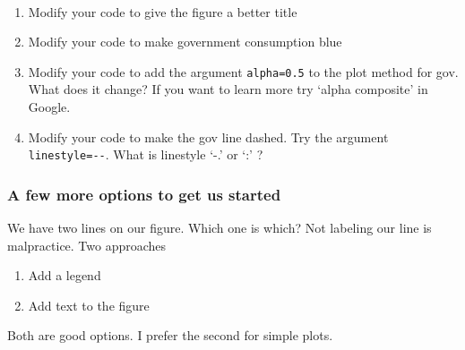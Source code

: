 \documentclass[11pt]{article}
\providecommand{\tightlist}{%
      \setlength{\itemsep}{0pt}\setlength{\parskip}{0pt}}
\begin{document}
    \begin{center}
    \end{center}
    { \hspace*{\fill} \\}
    
    \begin{enumerate}
\def\labelenumi{\arabic{enumi}.}
\setcounter{enumi}{1}
\tightlist
\item
  Modify your code to give the figure a better title
\item
  Modify your code to make government consumption blue
\item
  Modify your code to add the argument \texttt{alpha=0.5} to the plot
  method for gov. What does it change? If you want to learn more try
  `alpha composite' in Google.
\item
  Modify your code to make the gov line dashed. Try the argument
  \texttt{linestyle=\textquotesingle{}-\/-\textquotesingle{}}. What is
  linestyle `-.' or `:' ?
\end{enumerate}

    \hypertarget{a-few-more-options-to-get-us-started}{%
\subsubsection{A few more options to get us
started}\label{a-few-more-options-to-get-us-started}}

We have two lines on our figure. Which one is which? Not labeling our
line is malpractice. Two approaches

\begin{enumerate}
\def\labelenumi{\arabic{enumi}.}
\tightlist
\item
  Add a legend
\item
  Add text to the figure
\end{enumerate}

Both are good options. I prefer the second for simple plots.
\end{document}
